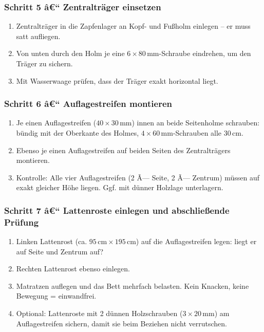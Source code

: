 ﻿\documentclass[12pt,a4paper]{article}
\theoremstyle{definition}
\theoremstyle{plain}
\theoremstyle{remark}
\begin{document}
\subsubsection*{Schritt 5 â€“ Zentralträger einsetzen}

\begin{enumerate}
  \item Zentralträger in die Zapfenlager an Kopf- und Fußholm
        einlegen -- er muss satt aufliegen.
  \item Von unten durch den Holm je eine $6 \times 80\,\text{mm}$-Schraube
        eindrehen, um den Träger zu sichern.
  \item Mit Wasserwaage prüfen, dass der Träger exakt horizontal liegt.
\end{enumerate}

\subsubsection*{Schritt 6 â€“ Auflagestreifen montieren}

\begin{enumerate}
  \item Je einen Auflagestreifen ($40 \times 30\,\text{mm}$) innen an beide
        Seitenholme schrauben: bündig mit der Oberkante des Holmes,
        $4 \times 60\,\text{mm}$-Schrauben alle $30\,\text{cm}$.
  \item Ebenso je einen Auflagestreifen auf beiden Seiten des
        Zentralträgers montieren.
  \item Kontrolle: Alle vier Auflagestreifen (2 Ã— Seite, 2 Ã— Zentrum)
        müssen auf exakt gleicher Höhe liegen. Ggf. mit dünner Holzlage
        unterlagern.
\end{enumerate}

\subsubsection*{Schritt 7 â€“ Lattenroste einlegen und abschließende Prüfung}

\begin{enumerate}
  \item Linken Lattenrost (ca. $95\,\text{cm} \times 195\,\text{cm}$) auf die
        Auflagestreifen legen: liegt er auf Seite und Zentrum auf?
  \item Rechten Lattenrost ebenso einlegen.
  \item Matratzen auflegen und das Bett mehrfach belasten.
        Kein Knacken, keine Bewegung = einwandfrei.
  \item Optional: Lattenroste mit 2 dünnen Holzschrauben ($3 \times 20\,\text{mm}$)
        am Auflagestreifen sichern, damit sie beim Beziehen nicht
        verrutschen.
\end{enumerate}
\end{document}
